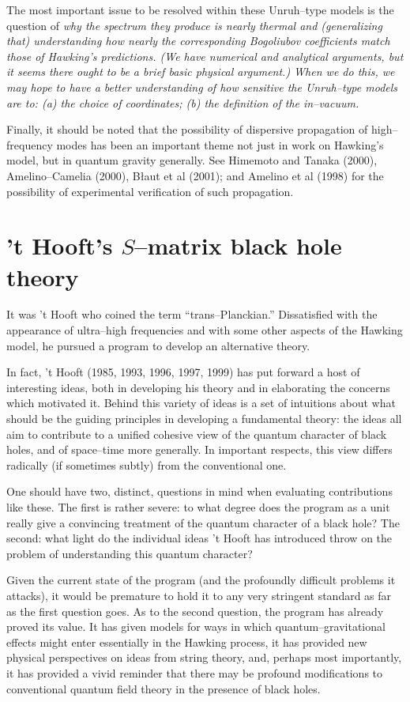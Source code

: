 The most important issue to be resolved within these Unruh--type models is the
question of \it why \rm the spectrum they produce is nearly thermal and
(generalizing that) understanding how nearly the corresponding Bogoliubov
coefficients match those of Hawking's predictions.   
(We have numerical and analytical arguments, but it seems there ought to be a
brief basic physical argument.)
When we do this, we may
hope to have a better understanding of how sensitive the Unruh--type models are
to:  (a) the choice of coordinates; (b) the definition of the in--vacuum.

Finally, it should be noted that the possibility of dispersive propagation of
high--frequency modes has been an important theme not just in work on Hawking's
model, but in quantum gravity generally.  See Himemoto and Tanaka (2000),
Amelino--Camelia (2000), B\l{}aut et al (2001); and Amelino et al (1998) for the
possibility of experimental verification of such propagation.

\section{'t Hooft's $S$--matrix black hole theory}

It was 't Hooft who coined the term ``trans--Planckian.''
Dissatisfied with the appearance of ultra--high frequencies and with
some other aspects of the Hawking model, he pursued a program to
develop an alternative theory.  

In fact, 't Hooft (1985, 1993, 1996, 1997, 1999)
has put forward a host of interesting ideas, both in
developing his theory and in elaborating the concerns which motivated
it.  Behind this variety of ideas is a set of intuitions about what 
should be the guiding
principles in developing a fundamental theory:  the ideas all aim to
contribute to a unified cohesive view of the quantum character of black 
holes, and of space--time more generally.  In important respects, this
view differs radically (if sometimes subtly) from the conventional one.

One should 
have two, distinct, questions in mind when evaluating 
contributions like these.  The first is rather severe:  to what
degree does the program as a unit
really give a convincing treatment of the
quantum character of a black hole?  The second:  what light do the
individual ideas 't Hooft has introduced throw on the problem of
understanding this quantum character?

Given the current state of the program (and the profoundly difficult
problems it attacks), it would be premature to hold it to any very
stringent standard as far as the first question goes.  As to the second
question, the program has already proved its value.  It has given
models for ways in which quantum--gravitational effects might enter
essentially in the Hawking process, it has provided new physical
perspectives on ideas from string theory, and, perhaps most
importantly, it has provided a vivid reminder that there may be 
profound modifications to conventional quantum field theory in the
presence of black holes. 

